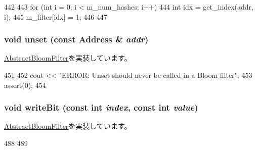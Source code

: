 \begin{DoxyCode}
442 {
443     for (int i = 0; i < m_num_hashes; i++) {
444         int idx = get_index(addr, i);
445         m_filter[idx] = 1;
446     }
447 }
\end{DoxyCode}
\hypertarget{classH3BloomFilter_a69b772787ea61467af679e3aa5406b41}{
\subsubsection[{unset}]{\setlength{\rightskip}{0pt plus 5cm}void unset (const {\bf Address} \& {\em addr})}}
\label{classH3BloomFilter_a69b772787ea61467af679e3aa5406b41}


\hyperlink{classAbstractBloomFilter_a0a35d1c7bad19fe9362068a0d319ec5f}{AbstractBloomFilter}を実装しています。


\begin{DoxyCode}
451 {
452     cout << "ERROR: Unset should never be called in a Bloom filter";
453     assert(0);
454 }
\end{DoxyCode}
\hypertarget{classH3BloomFilter_ac188318778d26b44f567c5b530598c16}{
\subsubsection[{writeBit}]{\setlength{\rightskip}{0pt plus 5cm}void writeBit (const int {\em index}, \/  const int {\em value})}}
\label{classH3BloomFilter_ac188318778d26b44f567c5b530598c16}


\hyperlink{classAbstractBloomFilter_a961813caf7bb3aece26914ac43c6293f}{AbstractBloomFilter}を実装しています。


\begin{DoxyCode}
488 {
489 }
\end{DoxyCode}


